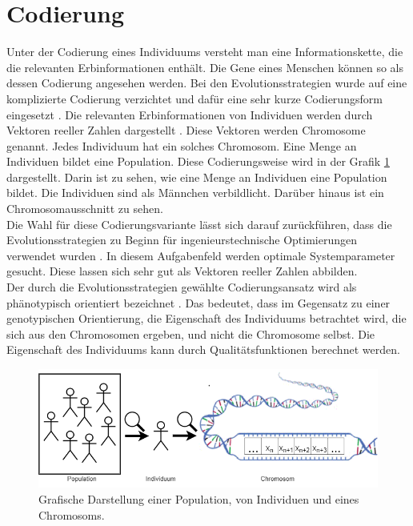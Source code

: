 \section{Codierung}
Unter der Codierung eines Individuums versteht man eine Informationskette, die die relevanten Erbinformationen enthält.
Die Gene eines Menschen können so als dessen Codierung angesehen werden.
Bei den Evolutionsstrategien wurde auf eine komplizierte Codierung verzichtet und dafür eine sehr kurze Codierungsform eingesetzt \cite[S.147]{schoeneburg}. Die relevanten Erbinformationen von Individuen werden durch Vektoren reeller Zahlen dargestellt \cite[S.147]{schoeneburg}. Diese Vektoren werden Chromosome genannt. Jedes Individuum hat ein solches Chromosom.
Eine Menge an Individuen bildet eine Population. Diese Codierungsweise wird in der Grafik \ref{fig:codierung} dargestellt. Darin ist zu sehen, wie eine Menge an Individuen eine Population bildet. Die Individuen sind als Männchen verbildlicht. Darüber hinaus ist ein Chromosomausschnitt zu sehen.\\
Die Wahl für diese Codierungsvariante lässt sich darauf zurückführen, dass die Evolutionsstrategien zu Beginn für ingenieurstechnische Optimierungen verwendet wurden \cite[S.147]{schoeneburg}.
In diesem Aufgabenfeld werden optimale Systemparameter gesucht. Diese lassen sich sehr gut als Vektoren reeller Zahlen abbilden.\\
Der durch die Evolutionsstrategien gewählte Codierungsansatz wird als phänotypisch orientiert bezeichnet \cite[S.148]{schoeneburg}. Das bedeutet, dass im Gegensatz zu einer genotypischen Orientierung, die Eigenschaft des Individuums betrachtet wird, die sich aus den Chromosomen ergeben, und nicht die Chromosome selbst.
Die Eigenschaft des Individuums kann durch Qualitätsfunktionen berechnet werden.

\begin{figure}[!htb]
	\centering
	\includegraphics[width=1.\textwidth]{img/codierung/codierung.png}
	\caption{Grafische Darstellung einer Population, von Individuen und eines Chromosoms.}
\label{fig:codierung}
\end{figure}


